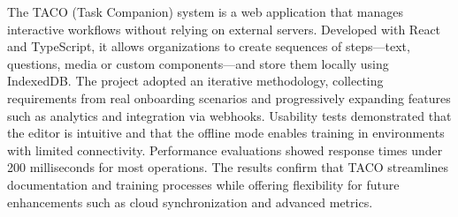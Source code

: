 The TACO (Task Companion) system is a web application that manages interactive workflows without relying on external servers. Developed with React and TypeScript, it allows organizations to create sequences of steps—text, questions, media or custom components—and store them locally using IndexedDB. The project adopted an iterative methodology, collecting requirements from real onboarding scenarios and progressively expanding features such as analytics and integration via webhooks. Usability tests demonstrated that the editor is intuitive and that the offline mode enables training in environments with limited connectivity. Performance evaluations showed response times under 200 milliseconds for most operations. The results confirm that TACO streamlines documentation and training processes while offering flexibility for future enhancements such as cloud synchronization and advanced metrics.
